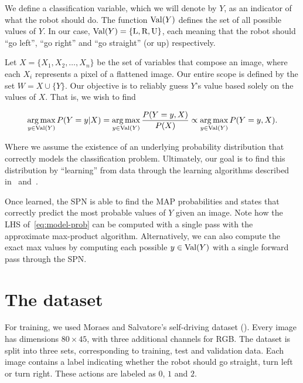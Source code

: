 We define a classification variable, which we will denote by $Y$, as an indicator of what the robot
should do. The function $\operatorname*{\text{Val}}(Y)$ defines the set of all possible values of $Y$. In our case,
$\operatorname*{\text{Val}}(Y)=\{\text{L},\text{R}, \text{U}\}$, each meaning that the robot should ``go left'', ``go right'' and
``go straight'' (or up) respectively.

Let $X=\{X_1,X_2,\ldots,X_n\}$ be the set of variables that compose an image, where each $X_i$
represents a pixel of a flattened image. Our entire scope is defined by the set $W=X\cup \{Y\}$.
Our objective is to reliably guess $Y$'s value based solely on the values of $X$. That is, we wish
to find

\begin{equation}\label{eq:model-prob}
  \operatorname*{arg\,max}_{y\in\operatorname*{\text{Val}}(Y)} P(Y=y|X) = \operatorname*{arg\,max}_{y\in\operatorname*{\text{Val}}(Y)} \frac{P(Y=y,X)}{P(X)}\propto
  \operatorname*{arg\,max}_{y\in\operatorname*{\text{Val}}(Y)} P(Y=y,X).
\end{equation}

Where we assume the existence of an underlying probability distribution that correctly models the
classification problem. Ultimately, our goal is to find this distribution by ``learning'' from data
through the learning algorithms described in~ and~.

Once learned, the SPN is able to find the MAP probabilities and states that correctly predict the
most probable values of $Y$ given an image. Note how the LHS of~\autoref{eq:model-prob} can be
computed with a single pass with the approximate max-product algorithm. Alternatively, we can also
compute the exact max values by computing each possible $y\in\operatorname*{\text{Val}}(Y)$ with a single forward pass
through the SPN.

\section{The dataset}

For training, we used Moraes and Salvatore's self-driving dataset (\cite{self-driving}). Every
image has dimensions $80\times 45$, with three additional channels for RGB. The dataset is split
into three sets, corresponding to training, test and validation data. Each image contains a label
indicating whether the robot should go straight, turn left or turn right. These actions are labeled
as $0$, $1$ and $2$.

